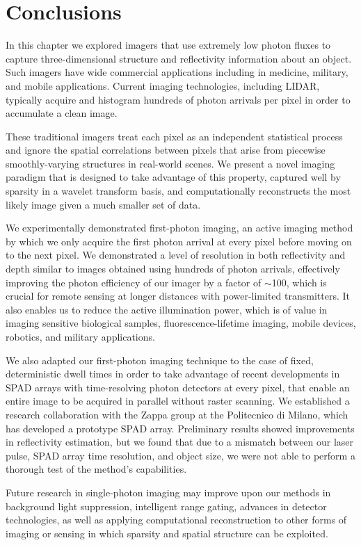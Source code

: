 \section{Conclusions}

In this chapter we explored imagers that use extremely low photon fluxes to capture three-dimensional structure and reflectivity information about an object. Such imagers have wide commercial applications including in medicine, military, and mobile applications. Current imaging technologies, including LIDAR, typically acquire and histogram hundreds of photon arrivals per pixel in order to accumulate a clean image.

These traditional imagers treat each pixel as an independent statistical process and ignore the spatial correlations between pixels that arise from piecewise smoothly-varying structures in real-world scenes. We present a novel imaging paradigm that is designed to take advantage of this property, captured well by sparsity in a wavelet transform basis, and computationally reconstructs the most likely image given a much smaller set of data.

We experimentally demonstrated first-photon imaging, an active imaging method by which we only acquire the first photon arrival at every pixel before moving on to the next pixel. We demonstrated a level of resolution in both reflectivity and depth similar to images obtained using hundreds of photon arrivals, effectively improving the photon efficiency of our imager by a factor of $\sim$100, which is crucial for remote sensing at longer distances with power-limited transmitters. It also enables us to reduce the active illumination power, which is of value in imaging sensitive biological samples, fluorescence-lifetime imaging, mobile devices, robotics, and military applications.

We also adapted our first-photon imaging technique to the case of fixed, deterministic dwell times in order to take advantage of recent developments in SPAD arrays with time-resolving photon detectors at every pixel, that enable an entire image to be acquired in parallel without raster scanning. We established a research collaboration with the Zappa group at the Politecnico di Milano, which has developed a prototype SPAD array. Preliminary results showed improvements in reflectivity estimation, but we found that due to a mismatch between our laser pulse, SPAD array time resolution, and object size, we were not able to perform a thorough test of the method's capabilities.

Future research in single-photon imaging may improve upon our methods in background light suppression, intelligent range gating, advances in detector technologies, as well as applying computational reconstruction to other forms of imaging or sensing in which sparsity and spatial structure can be exploited.


